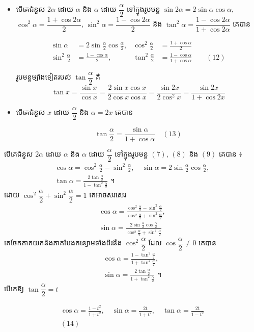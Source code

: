 \begin{itemize}
  \item បើគេជំនួស $2\alpha$ ដោយ $\alpha$ និង $\alpha$ ដោយ $\dfrac{\alpha}{2}$ ទៅក្នុងរូបមន្ត $\sin 2\alpha = 2\sin\alpha\cos\alpha$, $\cos^2\alpha = \dfrac{1 + \cos 2\alpha}{2}$, $\sin^2\alpha = \dfrac{1 - \cos 2\alpha}{2}$ និង $\tan^2\alpha = \dfrac{1 - \cos 2\alpha}{1 + \cos 2\alpha}$ គេបាន
  \begin{formulaBox}[រូបមន្ត]
  \[
  \begin{aligned}
  \sin\alpha &= 2\sin\frac{\alpha}{2}\cos\frac{\alpha}{2}, & \cos^2\frac{\alpha}{2} &= \frac{1 + \cos\alpha}{2}\\
  \sin^2\frac{\alpha}{2} &= \frac{1 - \cos\alpha}{2}, & \tan^2\frac{\alpha}{2} &= \frac{1 - \cos\alpha}{1 + \cos\alpha} \qquad (12)
  \end{aligned}
  \]
  \end{formulaBox}
  រូបមន្តម្យ៉ាងទៀតរបស់ $\tan\dfrac{\alpha}{2}$ គឺ
  \[ \tan x = \frac{\sin x}{\cos x} = \frac{2\sin x\cos x}{2\cos x\cos x} = \frac{\sin 2x}{2\cos^2 x} = \frac{\sin 2x}{1 + \cos 2x} \]
  \item បើគេជំនួស $x$ ដោយ $\dfrac{\alpha}{2}$ និង $\alpha = 2x$ គេបាន
  \begin{formulaBox}[រូបមន្ត]
  \[ \tan\frac{\alpha}{2} = \frac{\sin\alpha}{1 + \cos\alpha} \quad (13) \]
  \end{formulaBox}
\end{itemize}

បើគេជំនួស $2\alpha$ ដោយ $\alpha$ និង $\alpha$ ដោយ $\dfrac{\alpha}{2}$ ទៅក្នុងរូបមន្ត $(7)$, $(8)$ និង $(9)$ គេបាន ៖
\[
\begin{gathered}
\cos\alpha = \cos^2\frac{\alpha}{2} - \sin^2\frac{\alpha}{2}, \quad \sin\alpha = 2\sin\frac{\alpha}{2}\cos\frac{\alpha}{2},\\
\tan\alpha = \frac{2\tan\frac{\alpha}{2}}{1 - \tan^2\frac{\alpha}{2}} \text{ ។}
\end{gathered}
\]
ដោយ $\cos^2\dfrac{\alpha}{2} + \sin^2\dfrac{\alpha}{2} = 1$ គេអាចសរសេរ
\[
\begin{gathered}
\cos\alpha = \frac{\cos^2\frac{\alpha}{2} - \sin^2\frac{\alpha}{2}}{\cos^2\frac{\alpha}{2} + \sin^2\frac{\alpha}{2}},\\
\sin\alpha = \frac{2\sin\frac{\alpha}{2}\cos\frac{\alpha}{2}}{\cos^2\frac{\alpha}{2} + \sin^2\frac{\alpha}{2}}
\end{gathered}
\]
គេចែកភាគយកនិងភាគបែងកន្សោមទាំងពីរនឹង $\cos^2\dfrac{\alpha}{2}$ ដែល $\cos\dfrac{\alpha}{2} \ne 0$ គេបាន
\[
\begin{gathered}
\cos\alpha = \frac{1 - \tan^2\frac{\alpha}{2}}{1 + \tan^2\frac{\alpha}{2}},\\
\sin\alpha = \frac{2\tan\frac{\alpha}{2}}{1 + \tan^2\frac{\alpha}{2}} \text{ ។}
\end{gathered}
\]
បើគេឱ្យ $\tan\dfrac{\alpha}{2} = t$
\begin{formulaBox}[គេបានរូបមន្ត]
\[
\begin{gathered}
\cos\alpha = \frac{1 - t^2}{1 + t^2}, \quad \sin\alpha = \frac{2t}{1 + t^2}, \quad \tan\alpha = \frac{2t}{1 - t^2}\\
(14)
\end{gathered}
\]
\end{formulaBox}

